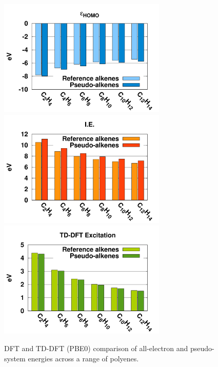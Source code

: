 \documentclass[12pt]{article}
\begin{document}
\begin{figure}
\begin{center}
\includegraphics[width=8cm]{short_pbe0_homo}
\includegraphics[width=8cm]{short_pbe0_ie}
\includegraphics[width=8cm]{short_pbe0_tddft}
\caption{DFT and TD-DFT (PBE0) comparison of all-electron and pseudo-system energies across a range of
polyenes.}
\label{fig:alkenes_hf_dft}
\end{center}
\vspace{0.25in}
\hspace*{3in}
\end{figure}
\end{document}
